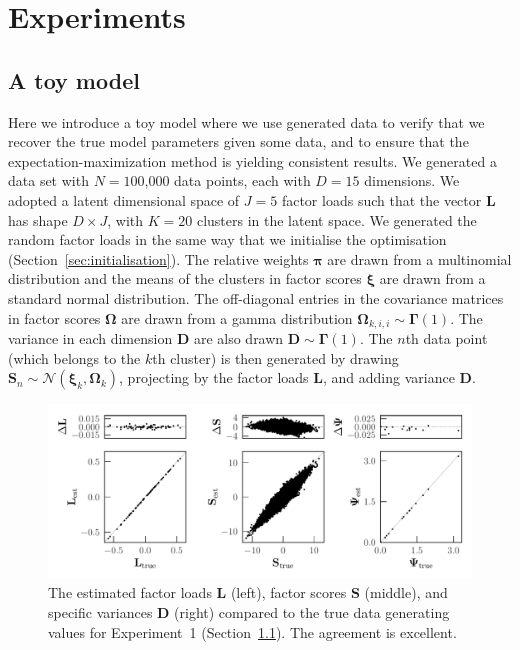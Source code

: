\documentclass[twocolumn]{aastex62}
\newcommand{\vect}[1]{\boldsymbol{\mathbf{#1}}}
\renewcommand{\vec}[1]{\vect{#1}}
\newcommand{\weight}{\pi}
\newcommand{\factorloads}{\textbf{L}}
\newcommand{\factorscores}{\textbf{S}}
\newcommand{\specificvariance}{\vec{D}}
\newcommand{\scoremeans}{\vec\xi}
\newcommand{\scorecovs}{\vec\Omega}
\newcommand{\NumData}{N}
\newcommand{\NumDimensions}{D}
\newcommand{\numdata}{n}
\newcommand{\NumLatentFactors}{J}
\newcommand{\NumComponents}{K}
\newcommand{\numcomponents}{k}
\begin{document}
\section{Experiments} \label{sec:experiments}


\subsection{A toy model} \label{sec:exp-1}

Here we introduce a toy model where we use generated data to verify that
we recover the true model parameters given some data, and to
ensure that the expectation-maximization method is yielding consistent results.
We generated a data set with ${\NumData = 1}$00,000 data points, each with
$\NumDimensions = 15$ dimensions. We adopted a latent dimensional space of 
$\NumLatentFactors = 5$ factor loads such that the vector $\factorloads$ has
shape $\NumDimensions \times \NumLatentFactors$,
with $\NumComponents = 20$ clusters in the latent space. 
We generated the random factor loads in the same way that we initialise the optimisation (Section~\ref{sec:initialisation}). The relative weights $\vec\weight$
are drawn from a multinomial distribution and the means of the clusters
in factor scores $\scoremeans$ are drawn from a standard normal
distribution. The off-diagonal entries in the covariance matrices in factor scores $\scorecovs$ are drawn from a gamma distribution $\scorecovs_{\numcomponents,i,i} \sim \vec\Gamma\left(1\right)$. The variance in 
each dimension $\specificvariance$ are also drawn $\specificvariance \sim \vec\Gamma\left(1\right)$.
The $\numdata$th data point (which belongs to the $\numcomponents$th cluster) is then
generated by drawing $\factorscores_{\numdata} \sim \mathcal{N}(\scoremeans_\numcomponents,\scorecovs_\numcomponents)$, projecting by the factor loads $\factorloads$, and adding variance $\specificvariance$.





\begin{figure}[t!]
	\includegraphics[width=\textwidth]{experiments/exp1-compare-all.pdf}
    \caption{The estimated factor loads $\factorloads$ (left), factor scores $\factorscores$ (middle),
    		 and specific variances $\specificvariance$ (right) compared to the 
		 	 true data generating values
		 	 for Experiment~1 (Section~\ref{sec:exp-1}). The agreement is excellent.}
    \label{fig:exp1-compare}
\end{figure}
\end{document}
